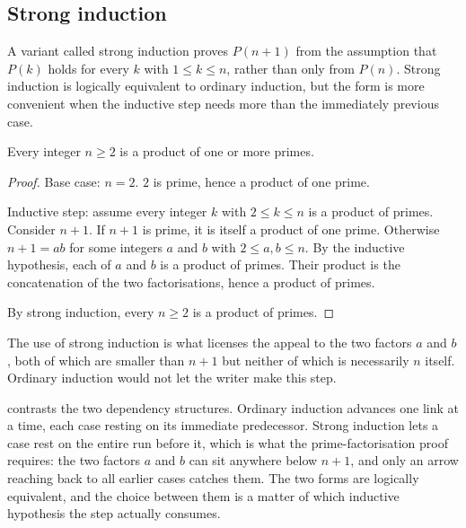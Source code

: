\subsection{Strong induction}

A variant called strong induction proves $P(n+1)$ from the assumption
that $P(k)$ holds for every $k$ with $1 \leq k \leq n$, rather than
only from $P(n)$. Strong induction is logically equivalent to
ordinary induction, but the form is more convenient when the
inductive step needs more than the immediately previous case.

\begin{theorem}
Every integer $n \geq 2$ is a product of one or more primes.
\end{theorem}

\begin{proof}
Base case: $n = 2$. $2$ is prime, hence a product of one prime.

Inductive step: assume every integer $k$ with $2 \leq k \leq n$ is
a product of primes. Consider $n+1$. If $n+1$ is prime, it is itself
a product of one prime. Otherwise $n+1 = a b$ for some integers $a$
and $b$ with $2 \leq a, b \leq n$. By the inductive hypothesis,
each of $a$ and $b$ is a product of primes. Their product is the
concatenation of the two factorisations, hence a product of primes.

By strong induction, every $n \geq 2$ is a product of primes.
\end{proof}

The use of strong induction is what licenses the appeal to the two
factors $a$ and $b$, both of which are smaller than $n+1$ but neither
of which is necessarily $n$ itself. Ordinary induction would not let
the writer make this step.



 contrasts the two dependency
structures. Ordinary induction advances one link at a time, each case
resting on its immediate predecessor. Strong induction lets a case rest
on the entire run before it, which is what the prime-factorisation proof
requires: the two factors $a$ and $b$ can sit anywhere below $n+1$, and
only an arrow reaching back to all earlier cases catches them. The two
forms are logically equivalent, and the choice between them is a matter
of which inductive hypothesis the step actually consumes.


